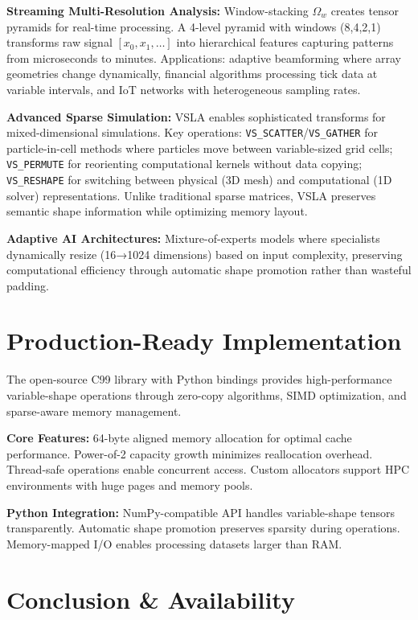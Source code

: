 \documentclass[sigconf]{acmart}
\begin{document}
\textbf{Streaming Multi-Resolution Analysis:} Window-stacking $\Omega_w$ creates tensor pyramids for real-time processing. A 4-level pyramid with windows (8,4,2,1) transforms raw signal $[x_0, x_1, \ldots]$ into hierarchical features capturing patterns from microseconds to minutes. Applications: adaptive beamforming where array geometries change dynamically, financial algorithms processing tick data at variable intervals, and IoT networks with heterogeneous sampling rates.

\textbf{Advanced Sparse Simulation:} VSLA enables sophisticated transforms for mixed-dimensional simulations. Key operations: \texttt{VS\_SCATTER}/\texttt{VS\_GATHER} for particle-in-cell methods where particles move between variable-sized grid cells; \texttt{VS\_PERMUTE} for reorienting computational kernels without data copying; \texttt{VS\_RESHAPE} for switching between physical (3D mesh) and computational (1D solver) representations. Unlike traditional sparse matrices, VSLA preserves semantic shape information while optimizing memory layout.

\textbf{Adaptive AI Architectures:} Mixture-of-experts models where specialists dynamically resize (16→1024 dimensions) based on input complexity, preserving computational efficiency through automatic shape promotion rather than wasteful padding.

\section{Production-Ready Implementation}

The open-source C99 library with Python bindings provides high-performance variable-shape operations through zero-copy algorithms, SIMD optimization, and sparse-aware memory management.

\textbf{Core Features:} 64-byte aligned memory allocation for optimal cache performance. Power-of-2 capacity growth minimizes reallocation overhead. Thread-safe operations enable concurrent access. Custom allocators support HPC environments with huge pages and memory pools.

\textbf{Python Integration:} NumPy-compatible API handles variable-shape tensors transparently. Automatic shape promotion preserves sparsity during operations. Memory-mapped I/O enables processing datasets larger than RAM.

\section{Conclusion \& Availability}
\end{document}
